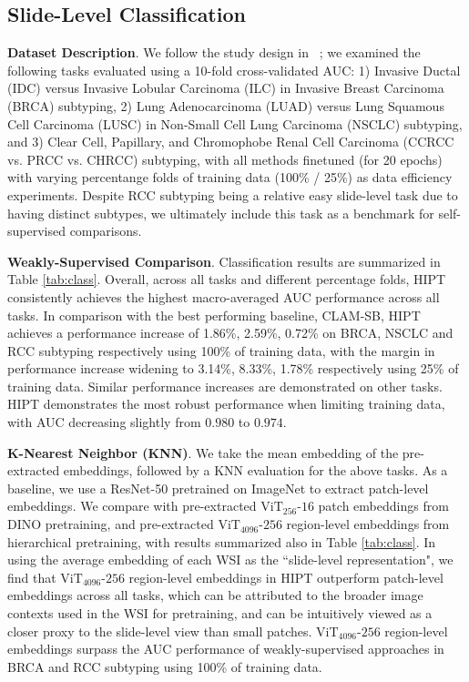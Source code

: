 {\subsection{Slide-Level Classification}

\textbf{Dataset Description}. We follow the study design in ~\cite{lu2020data}; we examined the following tasks evaluated using a 10-fold cross-validated AUC: 1) Invasive Ductal (IDC) versus Invasive Lobular Carcinoma (ILC) in Invasive Breast Carcinoma (BRCA) subtyping, 2) Lung Adenocarcinoma (LUAD) versus Lung Squamous Cell Carcinoma (LUSC) in Non-Small Cell Lung Carcinoma (NSCLC) subtyping, and 3) Clear Cell, Papillary, and Chromophobe Renal Cell Carcinoma (CCRCC vs. PRCC vs. CHRCC) subtyping, with all methods finetuned (for 20 epochs) with varying percentange folds of training data (100\% / 25\%) as data efficiency experiments. Despite RCC subtyping being a relative easy slide-level task due to having distinct subtypes, we ultimately include this task as a benchmark for self-supervised comparisons. 

\textbf{Weakly-Supervised Comparison}. Classification results are summarized in Table \ref{tab:class}. Overall, across all tasks and different percentage folds, HIPT consistently achieves the highest macro-averaged AUC performance across all tasks. In comparison with the best performing baseline, CLAM-SB, HIPT achieves a performance increase of 1.86\%, 2.59\%, 0.72\% on BRCA, NSCLC and RCC subtyping respectively using 100\% of training data, with the margin in performance increase widening to 3.14\%, 8.33\%, 1.78\% respectively using 25\% of training data. Similar performance increases are demonstrated on other tasks. HIPT demonstrates the most robust performance when limiting training data, with AUC decreasing slightly from $0.980$ to $0.974$.

\textbf{K-Nearest Neighbor (KNN)}. We take the mean embedding of the pre-extracted embeddings, followed by a KNN evaluation for the above tasks. As a baseline, we use a ResNet-50 pretrained on ImageNet to extract patch-level embeddings. We compare with pre-extracted $\operatorname{ViT_{256}\textrm{-}16}$ patch embeddings from DINO pretraining, and pre-extracted $\operatorname{ViT_{4096}\textrm{-}256}$ region-level embeddings from hierarchical pretraining, with results summarized also in Table \ref{tab:class}. In using the average embedding of each WSI as the ``slide-level representation", we find that $\operatorname{ViT_{4096}\textrm{-}256}$ region-level embeddings in HIPT outperform patch-level embeddings across all tasks, which can be attributed to the broader image contexts used in the WSI for pretraining, and can be intuitively viewed as a closer proxy to the slide-level view than small patches. $\operatorname{ViT_{4096}\textrm{-}256}$ region-level embeddings surpass the AUC performance of weakly-supervised approaches in BRCA and RCC subtyping using 100\% of training data. 

}
